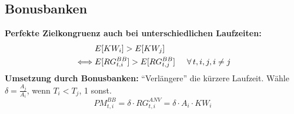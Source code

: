 \documentclass[leqno]{scrartcl}
\begin{document}
\begin{multicols}{4}
\subsection{Bonusbanken}
\textbf{Perfekte Zielkongruenz auch bei unterschiedlichen Laufzeiten:}
  \begin{align*}
    &E[KW_i] > E[KW_j]\\
    \iff & E[RG^{BB}_{t,i}] > E[RG^{BB}_{t,j}] \hspace{0.5cm} \forall\, t,i,j,i \neq j
  \end{align*}
\textbf{Umsetzung durch Bonusbanken:}
``Verlängere'' die kürzere Laufzeit. Wähle $\delta = \frac{A_j}{A_i}$, wenn $T_i < T_j$, 1 sonst.
  \begin{equation*}
    PM^{BB}_{t,i} = \delta \cdot RG^{ANV}_{t,i} = \delta \cdot A_{i} \cdot KW_i
  \end{equation*}

  
\end{multicols}
\end{document}
